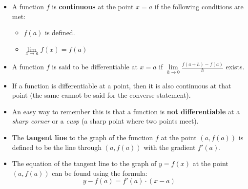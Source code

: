 \documentclass[12pt,a4paper,titlepage]{article}
\begin{document}
            \begin{SummaryBox}[title=Continuity of a function]
                \begin{itemize}[leftmargin=*]
                    \item A function $f$ is \textbf{continuous} at the point $x=a$ if the following conditions are met:
                    \begin{itemize}[topsep=0pt]
                        \item $f(a)$ is defined.
                        \item $\lim\limits_{x \to a} f(x) = f(a)$
                    \end{itemize}
                \end{itemize}
            \end{SummaryBox}
            
            \begin{SummaryBox}[title=Differentiability of a function]
                \begin{itemize}[leftmargin=*]
                    \item A function $f$ is said to be differentiable at $x=a$ if $\lim\limits_{h \to 0} \frac{f(a+h) - f(a)}{h}$ exists.
                    \item If a function is differentiable at a point, then it is also continuous at that point (the same cannot be said for the converse statement).
                    \item An easy way to remember this is that a function is \textbf{not differentiable} at a \textit{sharp corner} or a \textit{cusp} (a sharp point where two points meet).
                \end{itemize}
            \end{SummaryBox}
            
            \begin{SummaryBox}[title=Tangent line]
                \begin{itemize}[leftmargin=*]
                    \item The \textbf{tangent line} to the graph of the function $f$ at the point $(a, f(a))$ is defined to be the line through $(a, f(a))$ with the gradient $f'(a)$.
                    \item The equation of the tangent line to the graph of $y = f(x)$ at the point $(a, f(a))$ can be found using the formula:
                    \[
                        y - f(a) = f'(a) \cdot (x - a)
                    \]
                \end{itemize}
            \end{SummaryBox}
            
\end{document}
